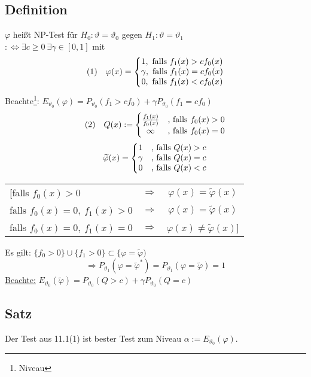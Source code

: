 \documentclass[a4paper,11pt,twoside,titlepage]{article}
\begin{document}
\subsection{Definition}
$\varphi$ heißt NP-Test für $H_0:\vartheta=\vartheta_0$ gegen $H_1:\vartheta=\vartheta_1$\\
$:\Leftrightarrow \exists c\geq 0\ \exists\gamma\in[0,1]$ mit
$$(1)\quad\varphi(x)=\left\{
\begin{matrix} 
1, \textnormal{ falls }f_1(x)>cf_0(x)\\
\gamma, \textnormal{ falls }f_1(x)=cf_0(x)\\
0, \textnormal{ falls }f_1(x)<cf_0(x)\\
\end{matrix}\right.$$
Beachte\footnote{Niveau}: $E_{\vartheta_0}(\varphi)=P_{\vartheta_0}(f_1>cf_0)+\gamma P_{\vartheta_0}(f_1=cf_0)$
$$(2)\quad Q(x):=\left\{\begin{matrix}
\frac{f_1(x)}{f_0(x)}&\textnormal{, falls }f_0(x)>0\\
\infty &\textnormal{, falls }f_0(x)=0
\end{matrix}\right.$$
$$\widetilde\varphi(x)=\left\{\begin{matrix}
1&\textnormal{, falls }Q(x)>c\\
\gamma&\textnormal{, falls }Q(x)=c\\
0&\textnormal{, falls }Q(x)<c\\
\end{matrix}\right.$$
\begin{tabular}{lcc}
[falls $f_0(x)>0$&$\Rightarrow$&$\varphi(x)=\widetilde\varphi(x)$\\
falls $f_0(x)=0,\ f_1(x)>0$&$\Rightarrow$&$\varphi(x)=\widetilde\varphi(x)$\\
falls $f_0(x)=0,\ f_1(x)=0$&$\Rightarrow$&$\varphi(x)\neq\widetilde\varphi(x)$]\end{tabular}

Es gilt: $\{f_0>0\}\cup\{f_1>0\}\subset\{\varphi=\widetilde\varphi)$
$$\Rightarrow P_{\vartheta_1}(\varphi=\widetilde\varphi^\ast)=P_{\vartheta_1}(\varphi=\widetilde\varphi)=1$$
\underline{Beachte:} $E_{\vartheta_0}(\widetilde\varphi)=P_{\vartheta_0}
(Q>c)+\gamma P_{\vartheta_0}(Q=c)$

\subsection{Satz}
Der Test aus 11.1(1) ist bester Test zum Niveau $\alpha:=E_{\vartheta_0}(\varphi)$.
\end{document}
